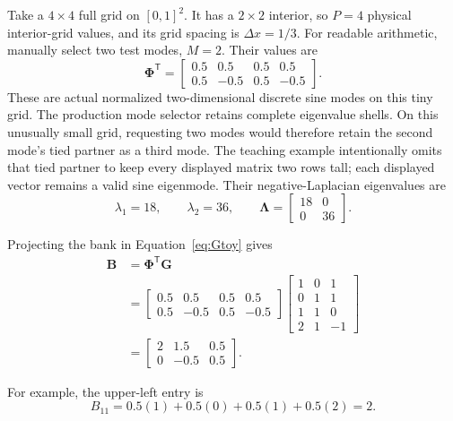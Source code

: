 \documentclass[11pt]{article}
\newcommand{\mat}[1]{\mathbf{#1}}
\begin{document}
Take a $4\times4$ full grid on $[0,1]^2$.  It has a $2\times2$ interior, so
$P=4$ physical interior-grid values, and its grid spacing is $\Delta x=1/3$.
For readable arithmetic,
manually select two test modes, $M=2$.  Their values are
\begin{equation}
  \mat{\Phi}^{\mathsf T}
  =\begin{bmatrix}
      0.5& 0.5&0.5& 0.5\\
      0.5&-0.5&0.5&-0.5
    \end{bmatrix}.
\end{equation}
These are actual normalized two-dimensional discrete sine modes on this tiny
grid.  The production mode selector retains complete eigenvalue shells.  On
this unusually small grid, requesting two modes would therefore retain the
second mode's tied partner as a third mode.  The teaching example intentionally
omits that tied partner to keep every displayed matrix two rows tall; each
displayed vector remains a valid sine eigenmode.  Their negative-Laplacian
eigenvalues are
\begin{equation}
  \lambda_1=18,
  \qquad
  \lambda_2=36,
  \qquad
  \mat{\Lambda}=\begin{bmatrix}18&0\\0&36\end{bmatrix}.
\end{equation}

Projecting the bank in Equation~\eqref{eq:Gtoy} gives
\begin{align}
  \mat{B}
  &=\mat{\Phi}^{\mathsf T}\mat{G}\\[0.25em]
  &=
  \begin{bmatrix}
      0.5& 0.5&0.5& 0.5\\
      0.5&-0.5&0.5&-0.5
    \end{bmatrix}
  \begin{bmatrix}
      1&0& 1\\
      0&1& 1\\
      1&1& 0\\
      2&1&-1
    \end{bmatrix}\\[0.25em]
  &=\begin{bmatrix}
      2& 1.5&0.5\\
      0&-0.5&0.5
    \end{bmatrix}.
\end{align}

For example, the upper-left entry is
\begin{equation}
  B_{11}=0.5(1)+0.5(0)+0.5(1)+0.5(2)=2.
\end{equation}
\end{document}
